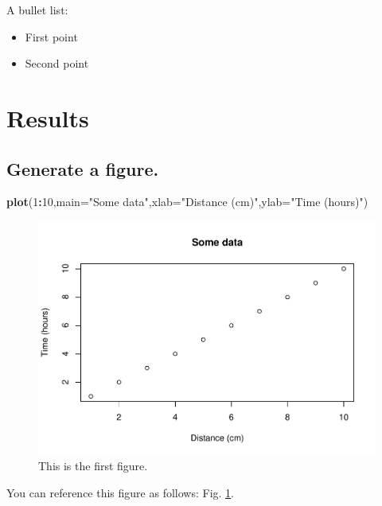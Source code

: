\documentclass[12pt,halfline,a4paper,]{ouparticle}
\newenvironment{Shaded}{\begin{snugshade}}{\end{snugshade}}
\newcommand{\DataTypeTok}[1]{\textcolor[rgb]{0.13,0.29,0.53}{#1}}
\newcommand{\DecValTok}[1]{\textcolor[rgb]{0.00,0.00,0.81}{#1}}
\newcommand{\KeywordTok}[1]{\textcolor[rgb]{0.13,0.29,0.53}{\textbf{#1}}}
\newcommand{\NormalTok}[1]{#1}
\newcommand{\OperatorTok}[1]{\textcolor[rgb]{0.81,0.36,0.00}{\textbf{#1}}}
\newcommand{\StringTok}[1]{\textcolor[rgb]{0.31,0.60,0.02}{#1}}
\providecommand{\tightlist}{%
  \setlength{\itemsep}{0pt}\setlength{\parskip}{0pt}}
\begin{document}
A bullet list:

\begin{itemize}
\tightlist
\item
  First point
\item
  Second point
\end{itemize}

\hypertarget{results}{%
\section{Results}\label{results}}

\hypertarget{generate-a-figure.}{%
\subsection{Generate a figure.}\label{generate-a-figure.}}

\begin{Shaded}
\begin{Highlighting}[]
\KeywordTok{plot}\NormalTok{(}\DecValTok{1}\OperatorTok{:}\DecValTok{10}\NormalTok{,}\DataTypeTok{main=}\StringTok{"Some data"}\NormalTok{,}\DataTypeTok{xlab=}\StringTok{"Distance (cm)"}\NormalTok{,}\DataTypeTok{ylab=}\StringTok{"Time (hours)"}\NormalTok{)}
\end{Highlighting}
\end{Shaded}

\begin{figure}[p]
\includegraphics[width=1\linewidth]{oxford-press_files/figure-latex/fig1-1} \caption{This is the first figure.}\label{fig:fig1}
\end{figure}

You can reference this figure as follows: Fig. \ref{fig:fig1}.
\end{document}
